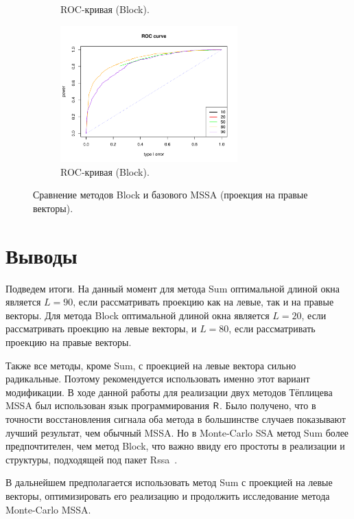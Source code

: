 \documentclass[specialist,
substylefile = spbu_report.rtx,
subf,href,colorlinks=true, 12pt]{disser}
\theoremstyle{definition}
\begin{document}
\begin{figure}
\begin{subfigure}[t]{0.45\textwidth}
			\caption{ROC-кривая (Block).}
		\end{subfigure}\hspace{\fill}
		\begin{subfigure}[t]{0.45\textwidth}
			\centering
			\includegraphics[width=0.75\textwidth]{roc_mssa_fa.pdf}
			\caption{ROC-кривая (Block).}
		\end{subfigure}
		\caption{Сравнение методов Block и базового MSSA (проекция на правые векторы).}
		\label{fig:block_fa}
	\end{figure}
	\section{Выводы}
	Подведем итоги. На данный момент для метода Sum оптимальной длиной окна является $L=90$, если рассматривать проекцию как на левые, так и на правые векторы. Для метода Block оптимальной длиной окна является $L=20$, если рассматривать проекцию на левые векторы, и $L=80$, если рассматривать проекцию на правые векторы.
	
	Также все методы, кроме Sum, с проекцией на левые вектора сильно радикальные. Поэтому рекомендуется использовать именно этот вариант модификации. 
	\conclusion
	В ходе данной работы для реализации двух методов Тёплицева MSSA был использован язык программирования $\mathsf{R}$. Было получено, что в точности восстановления сигнала оба метода в большинстве случаев показывают лучший результат, чем обычный MSSA. Но в Monte-Carlo SSA метод Sum более предпочтителен, чем метод Block, что важно ввиду его простоты в реализации и структуры, подходящей под пакет Rssa~\cite{Rssa}.
	
	В дальнейшем предполагается использовать метод Sum с проекцией на левые векторы, оптимизировать его реализацию и продолжить исследование метода Monte-Carlo MSSA.
	
	
	
\end{document}
